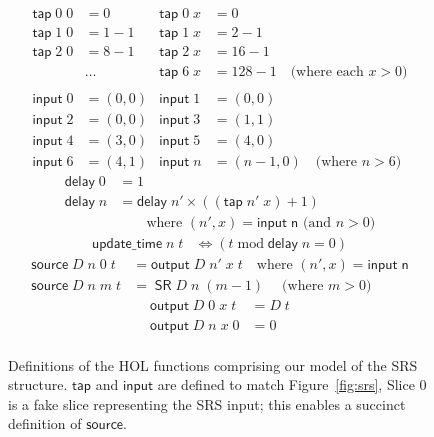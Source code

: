 \documentclass{llncs}
\begin{document}
\begin{figure}
\caption{
Definitions of the HOL functions comprising our model of the SRS structure.
\(\mathsf{tap}\) and \(\mathsf{input}\) are defined to match Figure~\ref{fig:srs}, %
Slice $0$ is a fake slice representing the SRS input; this enables a succinct definition of $\mathsf{source}$.
\label{fig:definitions}}
\begin{align*}
\mathsf{tap}\;0\;0&=0&\mathsf{tap}\;0\;x&=0\\
\mathsf{tap}\;1\;0&=1-1&\mathsf{tap}\;1\;x&=2-1\\
\mathsf{tap}\;2\;0&=8-1&\mathsf{tap}\;2\;x&=16-1\\
&\dots&\mathsf{tap}\;6\;x&=128-1\quad\text{(where each $x>0$)}\\\\
\mathsf{input}\;0&=(0,0)&\mathsf{input}\;1&=(0,0)\\
\mathsf{input}\;2&=(0,0)&\mathsf{input}\;3&=(1,1)\\
\mathsf{input}\;4&=(3,0)&\mathsf{input}\;5&=(4,0)\\
\mathsf{input}\;6&=(4,1)&\mathsf{input}\;n&=(n-1,0)\quad\text{(where $n>6$)}
\end{align*}
\begin{align*}
\mathsf{delay}\;0&=1\\
\mathsf{delay}\;n&=\mathsf{delay}\;n'\times((\mathsf{tap}\;n'\;x)+1)\\
&\qquad\text{where $(n',x)=\mathsf{input\;n}$ (and $n>0$)}
\end{align*}
\begin{align*}
\mathsf{update\_time}\;n\;t&\iff(t\operatorname{mod}\mathsf{delay}\;n=0)
\end{align*}
\begin{align*}
\mathsf{source}\;D\;n\;0\;t&=\mathsf{output}\;D\;n'\;x\;t\quad\text{where $(n',x)=\mathsf{input\;n}$}\\
\mathsf{source}\;D\;n\;m\;t&=\;\mathsf{SR}\;D\;n\;(m-1)\;\quad\text{(where $m>0$)}
\end{align*}
\begin{align*}
\mathsf{output}\;D\;0\;x\;t&=D\;t\\
\mathsf{output}\;D\;n\;x\;0&=0\\

\end{align*}
\end{figure}
\end{document}
